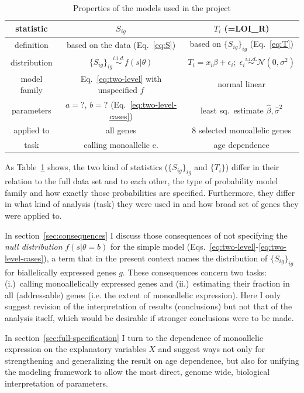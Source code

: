 \documentclass[letterpaper]{article}
\begin{document}
\begin{table}[t]
\label{tab:model-used}
\begin{center}
\begin{tabular}{c|c|c|}
statistic & \(S_{ig}\) & \(T_i\) (=LOI\_R) \\
\hline
definition & based on the data (Eq.~\ref{eq:S}) & based on \(\{S_{ig}\}_{ig}\) (Eq.~\ref{eq:T}) \\
distribution & \(\{S_{ig}\}_{ig} \overset{i.i.d.}{\sim} f(s |
\theta) \) &
\(T_{i} = x_i \beta + \epsilon_i; \; \epsilon_i \overset{i.i.d.}{\sim}
\mathcal{N}(0, \sigma^2)\) \\
model family & Eq.~\ref{eq:two-level} with unspecified \(f\)
 & normal linear \\
parameters & \(a=\)?, \(b=\)? (Eq.~\ref{eq:two-level-cases})
& least sq.~estimate \(\hat{\beta}, \hat{\sigma}^2\) \\
applied to & all genes & 8 selected monoallelic genes \\
task & calling monoallelic e. & age dependence \\
\hline
\end{tabular}
\end{center}
\caption{Properties of the models used in the project}
\end{table}

As Table~\ref{tab:model-used} shows, the two kind of statistics
(\(\{S_{ig}\}_{ig}\) and \(\{T_i\}\)) differ in their relation to the full
data set and to each other, the type of probability model family and how
exactly those probabilities are specified.  Furthermore, they differ in what
kind of analysis (task) they were used in and how broad set of genes they were
applied to.

In section~\ref{sec:consequences} I discuss those consequences of not
specifying the \emph{null distribution} \(f(s|\theta=b)\) for the simple model
(Eqs.~\ref{eq:two-level}-\ref{eq:two-level-cases}), a term that in the present
context names the distribution of \(\{S_{ig}\}_{ig}\) for biallelically
expressed genes \(g\).  These consequences concern two tasks: (i.)~calling
monoallelically expressed genes and (ii.)~estimating their fraction in all
(addressable) genes (i.e. the extent of monoallelic expression).  Here I only
suggest revision of the interpretation of results (conclusions) but not that
of the analysis itself, which would be desirable if stronger conclusions were
to be made.

In section~\ref{sec:full-specification} I turn to the dependence of monoallelic
expression on the explanatory variables \(X\) and suggest ways not only for
strengthening and generalizing the result on age dependence, but also for
unifying the modeling framework to allow the most direct, genome wide,
biological interpretation of parameters.
\end{document}
